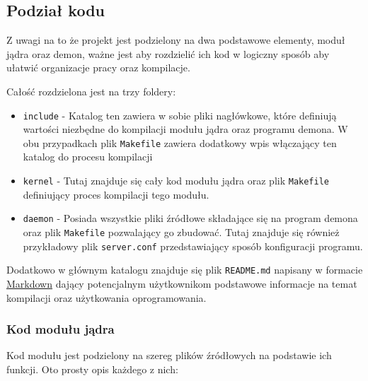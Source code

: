 \subsection{Podział kodu}

Z uwagi na to że projekt jest podzielony na dwa podstawowe elementy,
moduł jądra oraz demon, ważne jest aby rozdzielić ich kod w logiczny
sposób aby ułatwić organizacje pracy oraz kompilacje.

Całość rozdzielona jest na trzy foldery:

\begin{itemize}
\itemsep1pt\parskip0pt
\item
  \texttt{include} - Katalog ten zawiera w sobie pliki nagłówkowe, które
  definiują wartości niezbędne do kompilacji modułu jądra oraz programu
  demona. W obu przypadkach plik \texttt{Makefile} zawiera dodatkowy
  wpis włączający ten katalog do procesu kompilacji
\item
  \texttt{kernel} - Tutaj znajduje się cały kod modułu jądra oraz plik
  \texttt{Makefile} definiujący proces kompilacji tego modułu.
\item
  \texttt{daemon} - Posiada wszystkie pliki źródłowe składające się na
  program demona oraz plik \texttt{Makefile} pozwalający go zbudować.
  Tutaj znajduje się również przykładowy plik \texttt{server.conf}
  przedstawiający sposób konfiguracji programu.
\end{itemize}

Dodatkowo w głównym katalogu znajduje się plik \texttt{README.md}
napisany w formacie
\href{http://daringfireball.net/projects/markdown/}{Markdown} dający
potencjalnym użytkownikom podstawowe informacje na temat kompilacji oraz
użytkowania oprogramowania.

\subsubsection{Kod modułu jądra}

Kod modułu jest podzielony na szereg plików źródłowych na podstawie ich
funkcji. Oto prosty opis każdego z nich:

